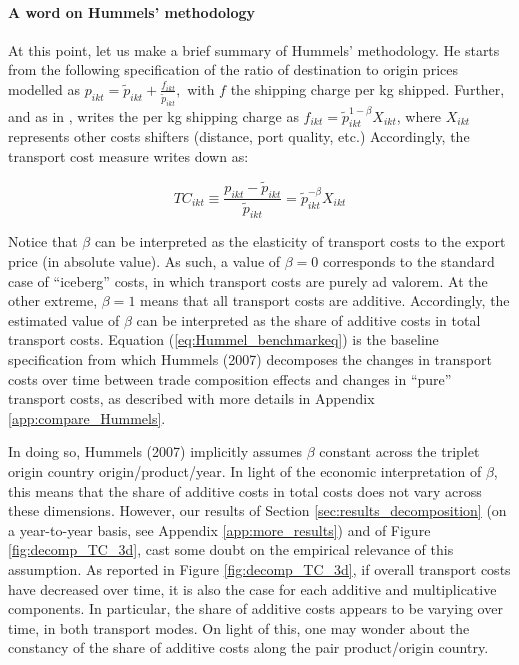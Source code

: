 \documentclass[a4paper,11pt]{article}
\begin{document}
\paragraph{A word on Hummels' methodology} At this point, let us make a brief summary of Hummels' methodology\nocite{hummels2007}. He starts from the following specification of the ratio of destination to origin prices modelled as $p_{ikt} = \widetilde{p}_{ikt}+\frac{f_{ikt}}{ \widetilde{p}_{ikt}},$ with $f$ the shipping charge per kg shipped. Further, and as in \cite{hummels_skiba}, \cite{hummels2007} writes the per kg shipping charge as $f_{ikt}=\widetilde{p}_{ikt}^{1-\beta}X_{ikt}$, where $X_{ikt}$ represents other costs shifters (distance, port quality, etc.) Accordingly, the transport cost measure writes down as:

\begin{equation}
TC_{ikt}\equiv \frac{p_{ikt}-\widetilde{p}_{ikt}}{\widetilde{p}_{ikt}} = \widetilde{p}_{ikt}^{-\beta}X_{ikt} \label{eq:Hummel_benchmarkeq}
\end{equation}

Notice that $\beta$ can be interpreted as the elasticity of transport costs to the export price (in absolute value). As such, a value of $\beta = 0$ corresponds to the standard case of ``iceberg'' costs, in which transport costs are purely ad valorem. At the other extreme, $\beta = 1$ means that all transport costs are additive. Accordingly, the estimated value of $\beta$ can be interpreted as the share of additive costs in total transport costs. Equation (\ref{eq:Hummel_benchmarkeq}) is the baseline specification from which Hummels (2007) decomposes the changes in transport costs over time between trade composition effects and changes in ``pure'' transport costs, as described with more details in Appendix \ref{app:compare_Hummels}.

In doing so, Hummels (2007) implicitly assumes $\beta$ constant across the triplet origin country origin/product/year. In light of the economic interpretation of $\beta$, this means that the share of additive costs in total costs does not vary across these dimensions. However, our results of Section \ref{sec:results_decomposition} (on a year-to-year basis, see Appendix \ref{app:more_results}) and of Figure \ref{fig:decomp_TC_3d}, cast some doubt on the empirical relevance of this assumption. As reported in Figure \ref{fig:decomp_TC_3d}, if overall transport costs have decreased over time, it is also the case for each additive and multiplicative components. In particular, the share of additive costs appears to be varying over time, in both transport modes. On light of this, one may wonder about the constancy of the share of additive costs along the pair product/origin country.
\end{document}
